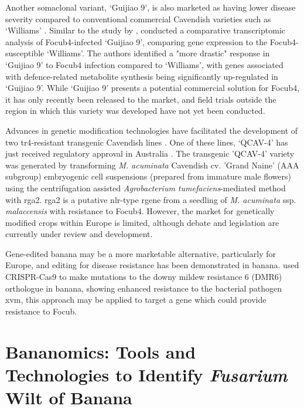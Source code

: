 Another somaclonal variant, ‘Guijiao 9’, is also marketed as having lower disease severity compared to conventional commercial Cavendish varieties such as ‘Williams’ \parencite{Sun2019}. Similar to the study by \textcite{wang2017differential}, \textcite{Sun2019} conducted a comparative transcriptomic analysis of \ac{Focub4}-infected ‘Guijiao 9’, comparing gene expression to the \ac{Focub4}-susceptible ‘Williams’. The authors identified a "more drastic" response in ‘Guijiao 9’ to \ac{Focub4} infection compared to ‘Williams’, with genes associated with defence-related metabolite synthesis being significantly up-regulated in ‘Guijiao 9’. While ‘Guijiao 9’ presents a potential commercial solution for \ac{Focub4}, it has only recently been released to the market, and field trials outside the region in which this variety was developed have not yet been conducted.

Advances in genetic modification technologies have facilitated the development of two \ac{tr4}-resistant transgenic Cavendish lines \parencite{Dale2017}. One of these lines, ‘QCAV-4’ has just received regulatory approval in Australia \parencite{GMApproval}. The transgenic 'QCAV-4' variety was generated by transforming \textit{M. acuminata }Cavendish cv. 'Grand Naine' (AAA subgroup) embryogenic cell suspensions (prepared from immature male flowers) using the centrifugation assisted \textit{Agrobacterium tumefaciens}-mediated method with \ac{rga2}. \ac{rga2} is a putative \ac{nlr}-type \acl{rgene} from a seedling of \textit{M. acuminata} ssp. \textit{malaccensis} with resistance to \ac{Focub4}. However, the market for genetically modified crops within Europe is limited, although debate and legislation are currently under review and development. 

Gene-edited banana may be a more marketable alternative, particularly for Europe, and editing for disease resistance has been demonstrated in banana. \textcite{Tripathi2021} used CRISPR-Cas9 to make mutations to the downy mildew resistance 6 (DMR6) orthologue in banana, showing enhanced resistance to the bacterial pathogen \acf{xvm}, this approach may be applied to target a gene which could provide resistance to \ac{Focub}.  

\section{Bananomics: Tools and Technologies to Identify \textit{Fusarium} Wilt of Banana}
\label{sec:chap1-diagnostics}

